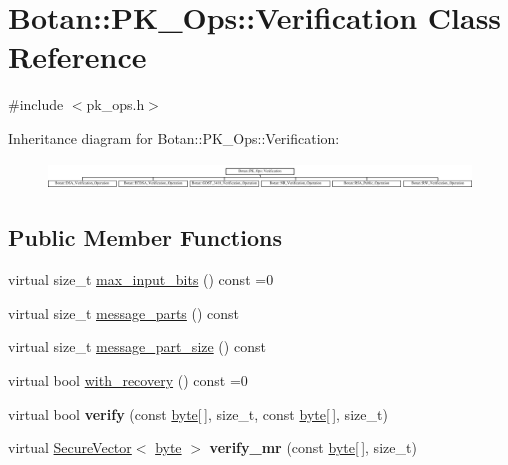 \hypertarget{classBotan_1_1PK__Ops_1_1Verification}{\section{Botan\-:\-:P\-K\-\_\-\-Ops\-:\-:Verification Class Reference}
\label{classBotan_1_1PK__Ops_1_1Verification}
}


{\ttfamily \#include $<$pk\-\_\-ops.\-h$>$}

Inheritance diagram for Botan\-:\-:P\-K\-\_\-\-Ops\-:\-:Verification\-:\begin{figure}[H]
\begin{center}
\leavevmode
\includegraphics[height=0.712468cm]{classBotan_1_1PK__Ops_1_1Verification}
\end{center}
\end{figure}
\subsection*{Public Member Functions}
\begin{DoxyCompactItemize}
\item 
virtual size\-\_\-t \hyperlink{classBotan_1_1PK__Ops_1_1Verification_a76a23969121f2ce0247ee431f25ddafa}{max\-\_\-input\-\_\-bits} () const =0
\item 
virtual size\-\_\-t \hyperlink{classBotan_1_1PK__Ops_1_1Verification_a58e1cb1b89a48967f15a591af9d8603d}{message\-\_\-parts} () const 
\item 
virtual size\-\_\-t \hyperlink{classBotan_1_1PK__Ops_1_1Verification_af8b9f40b8f091f7d3cc027c0ac4a8e68}{message\-\_\-part\-\_\-size} () const 
\item 
virtual bool \hyperlink{classBotan_1_1PK__Ops_1_1Verification_af66d51b7b6ae5e9b851815df23f7db7c}{with\-\_\-recovery} () const =0
\item 
\hypertarget{classBotan_1_1PK__Ops_1_1Verification_a38ebfea08dcb145662f0391cae18797d}{virtual bool {\bfseries verify} (const \hyperlink{namespaceBotan_a7d793989d801281df48c6b19616b8b84}{byte}\mbox{[}$\,$\mbox{]}, size\-\_\-t, const \hyperlink{namespaceBotan_a7d793989d801281df48c6b19616b8b84}{byte}\mbox{[}$\,$\mbox{]}, size\-\_\-t)}\label{classBotan_1_1PK__Ops_1_1Verification_a38ebfea08dcb145662f0391cae18797d}

\item 
\hypertarget{classBotan_1_1PK__Ops_1_1Verification_ae865a0e131f9f130a838cd104b51a52e}{virtual \hyperlink{classBotan_1_1SecureVector}{Secure\-Vector}$<$ \hyperlink{namespaceBotan_a7d793989d801281df48c6b19616b8b84}{byte} $>$ {\bfseries verify\-\_\-mr} (const \hyperlink{namespaceBotan_a7d793989d801281df48c6b19616b8b84}{byte}\mbox{[}$\,$\mbox{]}, size\-\_\-t)}\label{classBotan_1_1PK__Ops_1_1Verification_ae865a0e131f9f130a838cd104b51a52e}

\end{DoxyCompactItemize}



